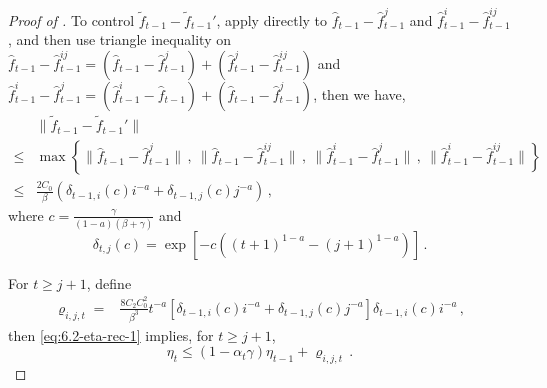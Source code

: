 \documentclass[10pt,a4paper]{amsart}
\begin{document}
\begin{proof}[Proof of ]
To control $\tilde f_{t-1}-\tilde f_{t-1}'$, apply  directly to $\hat f_{t-1}-\hat f_{t-1}^j$ and $\hat f_{t-1}^i-\hat f_{t-1}^{ij}$, and then use triangle inequality on $\hat f_{t-1}-\hat f_{t-1}^{ij}=(\hat f_{t-1}-\hat f_{t-1}^j)+(\hat f_{t-1}^j-\hat f_{t-1}^{ij})$ and $\hat f^i_{t-1}-\hat f_{t-1}^{j} = (\hat f_{t-1}^i-\hat f_{t-1})+(\hat f_{t-1}-\hat f_{t-1}^j)$, then we have,
\begin{align*}
 & \|\tilde f_{t-1}-\tilde f_{t-1}'\|\\
 \le & \max\left\{\|\hat f_{t-1}-\hat f_{t-1}^j\|\,,~\|\hat f_{t-1}-\hat f_{t-1}^{ij}\|\,,~\|\hat f_{t-1}^i-\hat f_{t-1}^j\|\,,~\|\hat f_{t-1}^i-\hat f_{t-1}^{ij}\|\right\}\\
\le 
& \frac{2C_0}{\beta}\left(\delta_{t-1,i}(c)i^{-a}+\delta_{t-1,j}(c)j^{-a}\right)\,,
\end{align*}
where $c=\frac{\gamma}{(1-a)(\beta+\gamma)}$ and
$$
\delta_{t,j}(c) = \exp\left[-c((t+1)^{1-a}-(j+1)^{1-a})\right]\,.
$$


For $t\ge j+1$, define 
\begin{align*}
\varrho_{i,j,t}=&\frac{8C_2C_0^2}{\beta^3}t^{-a}\left[\delta_{t-1,i}(c)i^{-a}+\delta_{t-1,j}(c)j^{-a}\right]\delta_{t-1,i}(c)i^{-a}\,,
\end{align*}
then \eqref{eq:6.2-eta-rec-1} implies, for $t\ge j+1$,
\begin{equation}\label{eq:6.2-eta-rec-2}
\eta_{t}\le (1-\alpha_{t}\gamma)\eta_{t-1}+\varrho_{i,j,t}\,.
\end{equation}



\end{proof}
\end{document}
